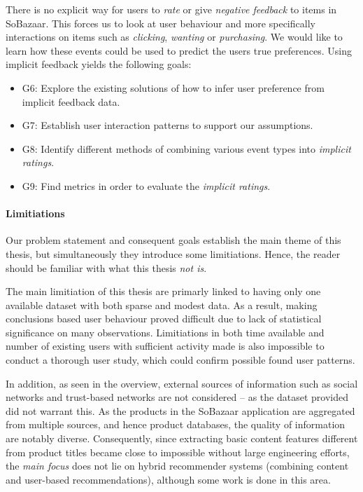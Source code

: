 There is no explicit way for users to \textit{rate} or give \textit{negative
feedback} to items in SoBazaar. This forces us to look at user behaviour and
more specifically interactions on items such as \textit{clicking},
\textit{wanting} or \textit{purchasing}. We would like to learn how these
events could be used to predict the users true preferences. Using implicit
feedback yields the following goals:

\begin{itemize}
  \item G6: Explore the existing solutions of how to infer user preference from
  implicit feedback data.
  \item G7: Establish user interaction patterns to support our assumptions.
  \item G8: Identify different methods of combining various event types into
  \emph{implicit ratings}.
  \item G9: Find metrics in order to evaluate the \emph{implicit ratings}.
\end{itemize}

\paragraph{Limitiations} Our problem statement and consequent goals establish
the main theme of this thesis, but simultaneously they introduce some
limitiations. Hence, the reader should be familiar with what this thesis
\textit{not is}.

The main limitiation of this thesis are primarly linked to having only one
available dataset with both sparse and modest data. As a result, making
conclusions based user behaviour proved difficult due to lack of statistical
significance on many observations. Limitiations in both time available and
number of existing users with sufficient activity made is also impossible to
conduct a thorough user study, which could confirm possible found user
patterns.

In addition, as seen in the overview, external sources of information such as
social networks and trust-based networks are not considered – as the dataset
provided did not warrant this. As the products in the SoBazaar application are
aggregated from multiple sources, and hence product databases, the quality of
information are notably diverse. Consequently, since extracting basic content
features different from product titles became close to impossible without large
engineering efforts, the \textit{main focus} does not lie on hybrid recommender
systems (combining content and user-based recommendations), although some work
is done in this area.

